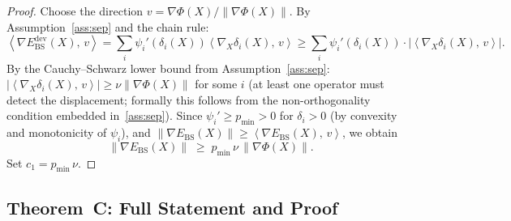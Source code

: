 \documentclass[11pt]{article}
\theoremstyle{definition}
\newcommand{\grad}{\nabla}
\newcommand{\Ebs}{E_{\mathrm{BS}}}
\newcommand{\norm}[1]{\left\|#1\right\|}
\newcommand{\inner}[2]{\left\langle #1,\, #2\right\rangle}
\begin{document}
\begin{proof}
Choose the direction $v = \grad\Phi(X)/\norm{\grad\Phi(X)}$.  By
Assumption~\ref{ass:sep} and the chain rule:
\[
  \inner{\grad\Ebs^{\mathrm{dev}}(X)}{v}
  = \sum_i \psi_i'(\delta_i(X))\inner{\grad_X\delta_i(X)}{v}
  \ge \sum_i \psi_i'(\delta_i(X))\cdot|\inner{\grad_X\delta_i(X)}{v}|.
\]
By the Cauchy--Schwarz lower bound from Assumption~\ref{ass:sep}:
$|\inner{\grad_X\delta_i(X)}{v}| \ge \nu\norm{\grad\Phi(X)}$ for some $i$
(at least one operator must detect the displacement; formally this follows from
the non-orthogonality condition embedded in~\ref{ass:sep}).
Since $\psi_i' \ge p_{\min} > 0$ for $\delta_i > 0$ (by convexity and
monotonicity of $\psi_i$), and $\norm{\grad\Ebs(X)}
\ge \inner{\grad\Ebs(X)}{v}$, we obtain
\[
  \norm{\grad\Ebs(X)} \;\ge\; p_{\min}\,\nu\,\norm{\grad\Phi(X)}.
\]
Set $c_1 = p_{\min}\,\nu$.
\end{proof}

\subsection{Theorem~C: Full Statement and Proof}
\label{sec:equiv:thm}
\end{document}
